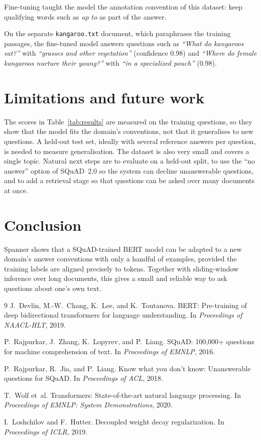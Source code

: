 \documentclass[11pt,a4paper]{article}
\begin{document}
Fine-tuning taught the model the annotation convention of this dataset: keep qualifying words such as \emph{up to} as part of the answer.

On the separate \texttt{kangaroo.txt} document, which paraphrases the training passages, the fine-tuned model answers questions such as \emph{``What do kangaroos eat?''} with \emph{``grasses and other vegetation''} (confidence 0.98) and \emph{``Where do female kangaroos nurture their young?''} with \emph{``in a specialized pouch''} (0.98).

\section{Limitations and future work}

The scores in Table~\ref{tab:results} are measured on the training questions, so they show that the model fits the domain's conventions, not that it generalises to new questions. A held-out test set, ideally with several reference answers per question, is needed to measure generalisation. The dataset is also very small and covers a single topic. Natural next steps are to evaluate on a held-out split, to use the ``no answer'' option of SQuAD~2.0 so the system can decline unanswerable questions, and to add a retrieval stage so that questions can be asked over many documents at once.

\section{Conclusion}

Spanner shows that a SQuAD-trained BERT model can be adapted to a new domain's answer conventions with only a handful of examples, provided the training labels are aligned precisely to tokens. Together with sliding-window inference over long documents, this gives a small and reliable way to ask questions about one's own text.

{\small
\begin{thebibliography}{9}
\setlength{\itemsep}{1pt}
J.~Devlin, M.-W.~Chang, K.~Lee, and K.~Toutanova.
BERT: Pre-training of deep bidirectional transformers for language understanding.
In \emph{Proceedings of NAACL-HLT}, 2019.

P.~Rajpurkar, J.~Zhang, K.~Lopyrev, and P.~Liang.
SQuAD: 100,000+ questions for machine comprehension of text.
In \emph{Proceedings of EMNLP}, 2016.

P.~Rajpurkar, R.~Jia, and P.~Liang.
Know what you don't know: Unanswerable questions for SQuAD.
In \emph{Proceedings of ACL}, 2018.

T.~Wolf et~al.
Transformers: State-of-the-art natural language processing.
In \emph{Proceedings of EMNLP: System Demonstrations}, 2020.

I.~Loshchilov and F.~Hutter.
Decoupled weight decay regularization.
In \emph{Proceedings of ICLR}, 2019.
\end{thebibliography}
}
\end{document}
